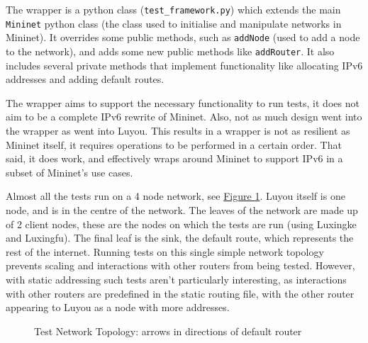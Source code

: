 \documentclass[12pt,a4paper,twoside,openright]{report}
\begin{document}
\bigskip

The wrapper is a python class (\verb!test_framework.py!) which extends the main \verb!Mininet! python class (the class used to initialise and manipulate networks in Mininet). It overrides some public methods, such as \verb!addNode! (used to add a node to the network), and adds some new public methods like \verb!addRouter!.  It also includes several private methods that implement functionality like allocating IPv6 addresses and adding default routes.  

\bigskip

The wrapper aims to support the necessary functionality to run tests, it does not aim to be a complete IPv6 rewrite of Mininet. Also, not as much design went into the wrapper as went into Luyou. This results in a wrapper is not as resilient as Mininet itself, it requires operations to be performed in a certain order.  That said, it does work, and effectively wraps around Mininet to support IPv6 in a subset of Mininet's use cases.

\bigskip

Almost all the tests run on a 4 node network, see \hyperref[fig::test_network]{Figure }\ref{fig::test_network}.  Luyou itself is one node, and is in the centre of the network.  The leaves of the network are made up of 2 client nodes, these are the nodes on which the tests are run (using Luxingke and Luxingfu).  The final leaf is the sink, the default route, which represents the rest of the internet.  Running tests on this single simple network topology prevents scaling and interactions with other routers from being tested. However, with static addressing such tests aren't particularly interesting, as interactions with other routers are predefined in the static routing file, with the other router appearing to Luyou as a node with more addresses.


\begin{figure}
\centering
{}
\caption{Test Network Topology: arrows in directions of default router}
\label{fig::test_network}
\end{figure}
\end{document}
